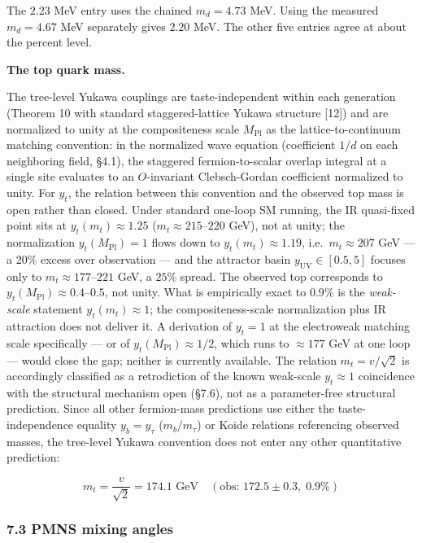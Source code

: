 \documentclass[
]{article}
\begin{document}
The \(2.23\) MeV entry uses the chained \(m_d = 4.73\) MeV. Using the
measured \(m_d = 4.67\) MeV separately gives \(2.20\) MeV. The other
five entries agree at about the percent level.

\textbf{The top quark mass.}

The tree-level Yukawa couplings are taste-independent within each
generation (Theorem 10 with standard staggered-lattice Yukawa structure
{[}12{]}) and are normalized to unity at the compositeness scale
\(M_{\text{Pl}}\) as the lattice-to-continuum matching convention: in
the normalized wave equation (coefficient \(1/d\) on each neighboring
field, §4.1), the staggered fermion-to-scalar overlap integral at a
single site evaluates to an \(O\)-invariant Clebsch-Gordan coefficient
normalized to unity. For \(y_t\), the relation between this convention
and the observed top mass is open rather than closed. Under standard
one-loop SM running, the IR quasi-fixed point sits at
\(y_t(m_t) \approx 1.25\) (\(m_t \approx 215\)--\(220\) GeV), not at
unity; the normalization \(y_t(M_{\text{Pl}}) = 1\) flows down to
\(y_t(m_t) \approx 1.19\), i.e.~\(m_t \approx 207\) GeV --- a \(20\%\)
excess over observation --- and the attractor basin
\(y_{\text{UV}} \in [0.5, 5]\) focuses only to
\(m_t \approx 177\)--\(221\) GeV, a \(25\%\) spread. The observed top
corresponds to \(y_t(M_{\text{Pl}}) \approx 0.4\)--\(0.5\), not unity.
What is empirically exact to \(0.9\%\) is the \emph{weak-scale}
statement \(y_t(m_t) \approx 1\); the compositeness-scale normalization
plus IR attraction does not deliver it. A derivation of \(y_t = 1\) at
the electroweak matching scale specifically --- or of
\(y_t(M_{\text{Pl}}) \approx 1/2\), which runs to \(\approx 177\) GeV at
one loop --- would close the gap; neither is currently available. The
relation \(m_t = v/\sqrt{2}\) is accordingly classified as a
retrodiction of the known weak-scale \(y_t \approx 1\) coincidence with
the structural mechanism open (§7.6), not as a parameter-free structural
prediction. Since all other fermion-mass predictions use either the
taste-independence equality \(y_b = y_\tau\) (\(m_b/m_\tau\)) or Koide
relations referencing observed masses, the tree-level Yukawa convention
does not enter any other quantitative prediction:

\[\boxed{m_t = \frac{v}{\sqrt{2}} = 174.1 \text{ GeV} \quad (\text{obs: } 172.5 \pm 0.3, \; 0.9\%)}\]

\hypertarget{pmns-mixing-angles}{%
\subsubsection{7.3 PMNS mixing angles}\label{pmns-mixing-angles}}
\end{document}
